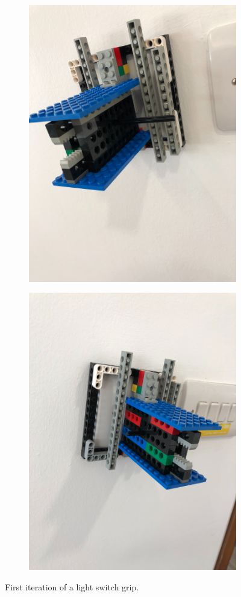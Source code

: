 \documentclass[onecolumn]{IEEEtran}
\begin{document}
\begin{figure}[H]
    \begin{subfigure}{.5\textwidth}
      \centering
      \includegraphics[width=.8\linewidth]{images/light-grip-1.jpg}
    \end{subfigure}
    \begin{subfigure}{.5\textwidth}
      \centering
      \includegraphics[width=.8\linewidth]{images/light-grip-2.jpg}
    \end{subfigure}
    \caption{First iteration of a light switch grip.}
    \label{fig:fig}
\end{figure}
\end{document}
